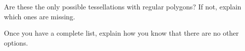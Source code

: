 \documentclass[noauthor,nooutcomes,handout]{../ximera}
\begin{document}
\begin{question}
 Are these the only possible tessellations with regular polygons? If not, explain which ones are missing.
 
 Once you have a complete list, explain how you know that there are no other options.
\end{question}
\end{document}
